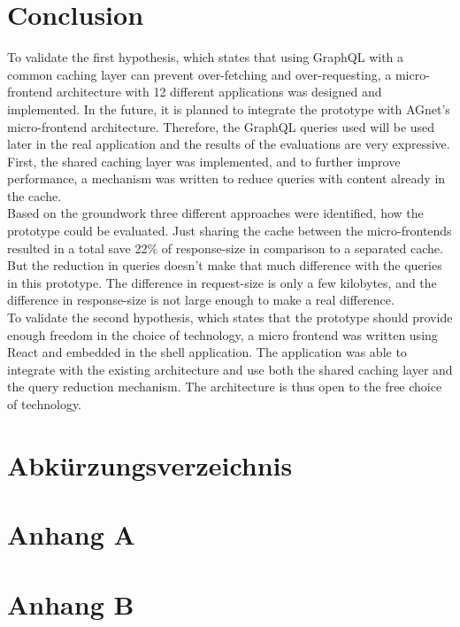 \documentclass[MSE,Master,english]{twbook}%
\providecommand\listacroname{}
\renewcommand\listacroname{List of Abbreviations}
\renewcommand\listacroname{Abkürzungsverzeichnis}
\begin{document}
\chapter{Conclusion}\label{chapter:conclusion}

To validate the first hypothesis, which states that using GraphQL with a common caching layer can prevent over-fetching and over-requesting, a micro-frontend architecture with 12 different applications was designed and implemented. In the future, it is planned to integrate the prototype with AGnet's micro-frontend architecture. Therefore, the GraphQL queries used will be used later in the real application and the results of the evaluations are very expressive.\\

First, the shared caching layer was implemented, and to further improve performance, a mechanism was written to reduce queries with content already in the cache.\\

Based on the groundwork three different approaches were identified, how the prototype could be evaluated. Just sharing the cache between the micro-frontends resulted in a total save 22\% of response-size in comparison to a separated cache.\\

But the reduction in queries doesn't make that much difference with the queries in this prototype. The difference in request-size is only a few kilobytes, and the difference in response-size is not large enough to make a real difference.\\

To validate the second hypothesis, which states that the prototype should provide enough freedom in the choice of technology, a micro frontend was written using React and embedded in the shell application. The application was able to integrate with the existing architecture and use both the shared caching layer and the query reduction mechanism. The architecture is thus open to the free choice of technology.\\

%
%
\clearpage
\printbibliography
\clearpage

\listoffigures
\clearpage

\listoftables
\clearpage

\listoflistings
\clearpage

\addcontentsline{toc}{chapter}{\listacroname}
\chapter*{\listacroname}
\begin{acronym}[XXXXX]
\end{acronym}

%
%
\clearpage
\appendix
\chapter{Anhang A}
\clearpage
\chapter{Anhang B}
\end{document}
